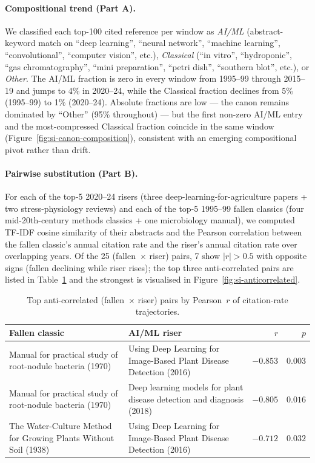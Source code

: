 \paragraph*{Compositional trend (Part A).}
We classified each top-100 cited reference per window as
\emph{AI/ML} (abstract-keyword match on ``deep learning'',
``neural network'', ``machine learning'', ``convolutional'',
``computer vision'', etc.), \emph{Classical}
(``in vitro'', ``hydroponic'', ``gas chromatography'',
``mini preparation'', ``petri dish'', ``southern blot'', etc.),
or \emph{Other}. The AI/ML fraction is zero in every window from
1995--99 through 2015--19 and jumps to 4\% in 2020--24, while the
Classical fraction declines from 5\% (1995--99) to 1\% (2020--24).
Absolute fractions are low --- the canon remains dominated by
``Other'' (95\% throughout) --- but the first non-zero AI/ML entry
and the most-compressed Classical fraction coincide in the same
window (Figure~\ref{fig:si-canon-composition}), consistent with
an emerging compositional pivot rather than drift.

\paragraph*{Pairwise substitution (Part B).}
For each of the top-5 2020--24 risers (three deep-learning-for-agriculture
papers + two stress-physiology reviews) and each of the top-5
1995--99 fallen classics (four mid-20th-century methods classics + one
microbiology manual), we computed TF-IDF cosine similarity of their
abstracts and the Pearson correlation between the fallen classic's
annual citation rate and the riser's annual citation rate over
overlapping years. Of the 25 (fallen~$\times$ riser) pairs, 7 show
$|r| > 0.5$ with opposite signs (fallen declining while riser rises);
the top three anti-correlated pairs are listed in
Table~\ref{tab:si-anticorrelated-pairs} and the strongest is visualised in
Figure~\ref{fig:si-anticorrelated}.

\begin{table}[H]
\centering
\caption{Top anti-correlated (fallen~$\times$ riser) pairs by Pearson~$r$
of citation-rate trajectories.}
\label{tab:si-anticorrelated-pairs}
\begin{tabular}{p{6cm}p{6cm}rr}
\toprule
Fallen classic & AI/ML riser & $r$ & $p$ \\
\midrule
Manual for practical study of root-nodule bacteria (1970) &
Using Deep Learning for Image-Based Plant Disease Detection (2016) &
$-0.853$ & $0.003$ \\
Manual for practical study of root-nodule bacteria (1970) &
Deep learning models for plant disease detection and diagnosis (2018) &
$-0.805$ & $0.016$ \\
The Water-Culture Method for Growing Plants Without Soil (1938) &
Using Deep Learning for Image-Based Plant Disease Detection (2016) &
$-0.712$ & $0.032$ \\
\bottomrule
\end{tabular}
\end{table}

